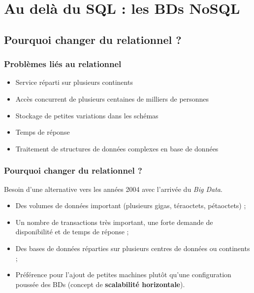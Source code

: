 \section{Au delà du SQL : les BDs NoSQL}

    \subsection{Pourquoi changer du relationnel ?}
    \begin{frame}
        \frametitle{Problèmes liés au relationnel}

        \begin{itemize}
            \item Service réparti sur plusieurs continents
            \item Accès concurrent de plusieurs centaines de milliers de personnes
            \item Stockage de petites variations dans les schémas
            \item Temps de réponse
            \item Traitement de structures de données complexes en base de données
        \end{itemize}
    \end{frame}

    \begin{frame}
        \frametitle{Pourquoi changer du relationnel ?}

        Besoin d'une alternative vers les années 2004 avec l'arrivée du \textit{Big Data}.
        \begin{itemize}
            \item Des volumes de données important (plusieurs gigas, téraoctets, pétaoctets) ;
            \item Un nombre de transactions très important, une forte demande de disponibilité et de temps de réponse ;
            \item Des bases de données réparties sur plusieurs centres de données ou continents ;
            \item Préférence pour l'ajout de petites machines plutôt qu'une configuration poussée des BDs (concept de \textbf{scalabilité horizontale}).
        \end{itemize}
    \end{frame}

